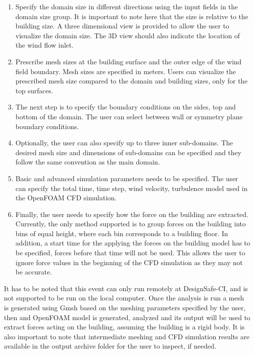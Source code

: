 \begin{enumerate}
\item Specify the domain size in different directions using the input fields in the domain size group. It is important to note here that the size is relative to the building size. A three dimensional view is provided to allow the user to visualize the domain size. The 3D view should also indicate the location of the wind flow inlet.

\item Prescribe mesh sizes at the building surface and the outer edge of the wind field boundary. Mesh sizes are specified in meters. Users can visualize the prescribed mesh size compared to the domain and building sizes, only for the top surfaces.

\item The next step is to specify the boundary conditions on the sides, top and bottom of the domain. The user can select between wall or symmetry plane boundary conditions.

\item Optionally, the user can also specify up to three inner sub-domains. The desired mesh size and dimensions of sub-domains can be specified and they follow the same convention as the main domain.

\item Basic and advanced simulation parameters needs to be specified. The user can specify the total time, time step, wind velocity, turbulence model used in the OpenFOAM CFD simulation.

\item  Finally, the user needs to specify how the force on the building are extracted. Currently, the only method supported is to group forces on the building into bins of equal height, where each bin corresponds to a building floor. In addition, a start time for the applying the forces on the building model has to be specified, forces before that time will not be used. This allows the user to ignore force values in the beginning of the CFD simulation as they may not be accurate.

\end{enumerate}

It has to be noted that this event can only run remotely at DesignSafe-CI, and is not supported to be run on the local computer. Once the analysis is run a mesh is generated using Gmsh based on the meshing parameters specified by the user, then and OpenFOAM model is generated, analyzed and its output will be used to extract forces acting on the building, assuming the building is a rigid body. It is also important to note that intermediate meshing and CFD simulation results are available in the output archive folder for the user to inspect, if needed. 
